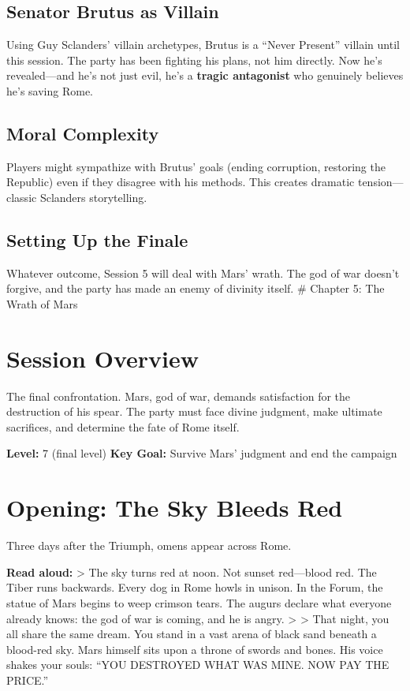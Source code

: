 \documentclass[
]{book}
\begin{document}
\subsection{Senator Brutus as Villain}\label{senator-brutus-as-villain}

Using Guy Sclanders' villain archetypes, Brutus is a ``Never Present''
villain until this session. The party has been fighting his plans, not
him directly. Now he's revealed---and he's not just evil, he's a
\textbf{tragic antagonist} who genuinely believes he's saving Rome.

\subsection{Moral Complexity}\label{moral-complexity}

Players might sympathize with Brutus' goals (ending corruption,
restoring the Republic) even if they disagree with his methods. This
creates dramatic tension---classic Sclanders storytelling.

\subsection{Setting Up the Finale}\label{setting-up-the-finale}

Whatever outcome, Session 5 will deal with Mars' wrath. The god of war
doesn't forgive, and the party has made an enemy of divinity itself. \#
Chapter 5: The Wrath of Mars

\section{Session Overview}\label{session-overview-4}

The final confrontation. Mars, god of war, demands satisfaction for the
destruction of his spear. The party must face divine judgment, make
ultimate sacrifices, and determine the fate of Rome itself.

\textbf{Level:} 7 (final level) \textbf{Key Goal:} Survive Mars'
judgment and end the campaign

\section{Opening: The Sky Bleeds Red}\label{opening-the-sky-bleeds-red}

Three days after the Triumph, omens appear across Rome.

\textbf{Read aloud:} \textgreater{} The sky turns red at noon. Not
sunset red---blood red. The Tiber runs backwards. Every dog in Rome
howls in unison. In the Forum, the statue of Mars begins to weep crimson
tears. The augurs declare what everyone already knows: the god of war is
coming, and he is angry. \textgreater{} \textgreater{} That night, you
all share the same dream. You stand in a vast arena of black sand
beneath a blood-red sky. Mars himself sits upon a throne of swords and
bones. His voice shakes your souls: ``YOU DESTROYED WHAT WAS MINE. NOW
PAY THE PRICE.''
\end{document}
